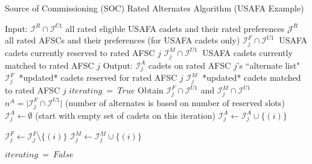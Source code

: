 \documentclass{article}
\begin{document}
\begin{algorithm}
\caption{Source of Commissioning (SOC) Rated Alternates Algorithm (USAFA Example)}
\begin{algorithmic}[1]

    \State Input:
    \State \hspace{0.42cm} $\mathcal{I}^{R} \cap \mathcal{I}^{U1}$ all rated eligible USAFA cadets and their rated preferences
    \State \hspace{0.42cm} $\mathcal{J}^{R} \ $ all rated AFSCs and their preferences (for USAFA cadets only)
    \State \hspace{0.42cm} $\mathcal{I}^{F}_j \cap \mathcal{I}^{U1} \ $ USAFA cadets currently reserved to rated AFSC $j$
    \State \hspace{0.42cm} $\mathcal{I}^{M}_j \cap \mathcal{I}^{U1} \ $ USAFA cadets currently matched to rated AFSC $j$
    \State Output:
    \State \hspace{0.42cm} $\mathcal{I}^{A}_j$ cadets on rated AFSC $j$'s ``alternate list"
    \State \hspace{0.42cm} $\mathcal{I}^{F}_j \ $ *updated* cadets reserved for rated AFSC $j$
    \State \hspace{0.42cm} $\mathcal{I}^{M}_j \ $ *updated* cadets matched to rated AFSC $j$
    \State $iterating \ = \ True$
            \State Obtain $\mathcal{I}^{F}_j \cap \mathcal{I}^{U1}$ and $\mathcal{I}^{M}_j \cap \mathcal{I}^{U1}$
            \State $n^A = \lvert \mathcal{I}^{F}_j \cap \mathcal{I}^{U1} \rvert$ (number of alternates is based on number of reserved slots)
            \State $\mathcal{I}^{A}_j \leftarrow \emptyset$ (start with empty set of cadets on this iteration)
                        \State $\mathcal{I}^{A}_j \leftarrow \mathcal{I}^{A}_j \cup \{ (i)\}$
                    \EndIf
                \EndIf
            \EndFor
        \EndFor

                    \State $\mathcal{I}^{F}_j \leftarrow \mathcal{I}^{F}_j \setminus \{ (i) \}$
                    \State $\mathcal{I}^{M}_j \leftarrow \mathcal{I}^{M}_j \cup \{ (i) \}$
                \EndIf
            \EndFor
        \EndFor

            \State $iterating \ = \ False$
        \EndIf
    \EndWhile

\end{algorithmic}
\end{algorithm}
\end{document}
